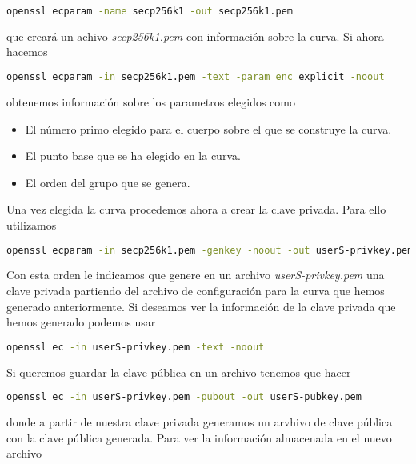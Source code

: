 \documentclass{article}
\begin{document}
\begin{lstlisting}[language=bash]
  openssl ecparam -name secp256k1 -out secp256k1.pem
\end{lstlisting}

que creará un achivo \textit{secp256k1.pem} con información sobre la curva. Si
ahora hacemos

\begin{lstlisting}[language=bash]
  openssl ecparam -in secp256k1.pem -text -param_enc explicit -noout
\end{lstlisting}

obtenemos información sobre los parametros elegidos como 

\begin{itemize}
  \item El número primo elegido para el cuerpo sobre el que se construye la curva.
  \item El punto base que se ha elegido en la curva.
  \item El orden del grupo que se genera.
\end{itemize}

Una vez elegida la curva procedemos ahora a crear la clave privada. Para ello
utilizamos 

\label{genkey}
\begin{lstlisting}[language=bash]
  openssl ecparam -in secp256k1.pem -genkey -noout -out userS-privkey.pem
\end{lstlisting}

Con esta orden le indicamos que genere en un archivo \textit{userS-privkey.pem}
una clave privada partiendo del archivo de configuración para la curva que hemos
generado anteriormente. Si deseamos ver la información de la clave privada que
hemos generado podemos usar 

\begin{lstlisting}[language=bash]
  openssl ec -in userS-privkey.pem -text -noout
\end{lstlisting}

Si queremos guardar la clave pública en un archivo tenemos que hacer 

\begin{lstlisting}[language=bash]
  openssl ec -in userS-privkey.pem -pubout -out userS-pubkey.pem
\end{lstlisting}

donde a partir de nuestra clave privada generamos un arvhivo de clave pública
con la clave pública generada. Para ver la información almacenada en el nuevo
archivo 
\end{document}
